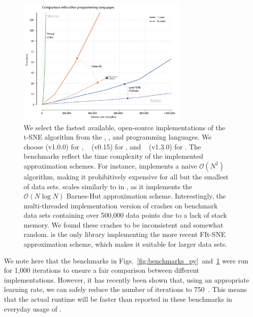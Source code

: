 \documentclass[article]{jss}
\newcommand{\opentsne}{\pkg{openTSNE}\xspace}
\begin{document}
\begin{figure}[ht]
  \centering
  \includegraphics[width=0.75\textwidth]{benchmarks_langs-final}
  \caption{\label{fig:benchmarks_lang}
  We select the fastest available, open-source implementations of the t-SNE algorithm from the , , and  programming languages. We choose \opentsne (v1.0.0) for , ~\citep{krijthe2015rtsne} (v0.15) for , and ~\citep{julia_tsne} (v1.3.0) for . The benchmarks reflect the time complexity of the implemented approximation schemes. For instance,  implements a naive $\mathcal{O}(N^2)$ algorithm, making it prohibitively expensive for all but the smallest of data sets.  scales similarly to  in , as it implements the $\mathcal{O}(N \log N)$ Barnes-Hut approximation scheme. Interestingly, the multi-threaded implementation version of  crashes on benchmark data sets containing over 500,000 data points due to a lack of stack memory. We found these crashes to be inconsistent and somewhat random. \opentsne is the only library implementing the more recent FIt-SNE approximation scheme, which makes it suitable for larger data sets. }
\end{figure}

We note here that the benchmarks in Figs.~\ref{fig:benchmarks_py}~and~\ref{fig:benchmarks_lang} were run for 1,000 iterations to ensure a fair comparison between different implementations. However, it has recently been shown that, using an appropriate learning rate, we can safely reduce the number of iterations to 750~\citep{belkina2019automated}. This means that the actual runtime will be faster than reported in these benchmarks in everyday usage of \opentsne.
\end{document}
